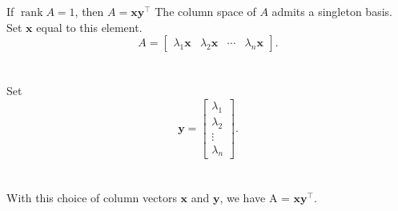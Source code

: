 \documentclass[handout]{beamer}
\def\x{\bm{x}}
\def\y{\bm{y}}
\def\rank{\operatorname{rank}}
\begin{document}
        \begin{frame}{If $\rank{A} = 1$, then $A = \x\y^\top$}
                The column space of $A$ admits a singleton basis. Set $\x$ equal to this element. \\
                \[
                        A = \begin{bmatrix}
                                \lambda_1\x & \lambda_2\x & \cdots & \lambda_n\x
                        \end{bmatrix}.
                \] \\~\\
                \pause
                Set
                \[
                        \y = \begin{bmatrix}
                                \lambda_1 \\ \lambda_2 \\ \vdots \\ \lambda_n
                        \end{bmatrix}.
                \]\\~\\
                With this choice of column vectors $\x$ and $\y$, we have A = $\x\y^\top$.
        \end{frame}
\end{document}
